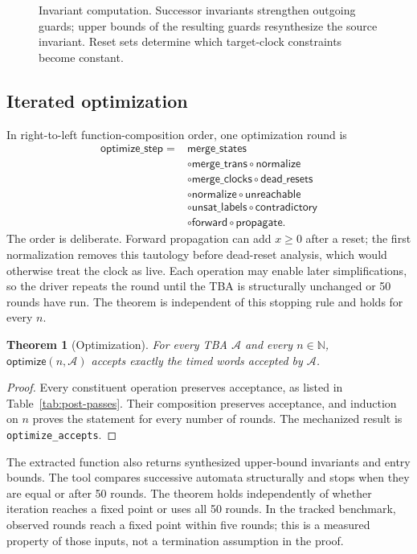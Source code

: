 \documentclass{ieeeaccess}
\providecommand{\Nat}{\mathbb{N}}
\providecommand{\optimize}{\mathsf{optimize}}
\newtheorem{theorem}{Theorem}[section]
\begin{document}
\begin{figure}[t]
\centering

\caption{Invariant computation. Successor invariants strengthen outgoing
guards; upper bounds of the resulting guards resynthesize the source
invariant. Reset sets determine which target-clock constraints become
constant.}
\label{fig:main-inv-unified}
\end{figure}



\subsection{Iterated optimization}
\label{sec:main-pipeline}
In right-to-left function-composition order, one optimization round is
\[
\begin{aligned}
\mathsf{optimize\_step}={}&\mathsf{merge\_states}\\
 &\circ\mathsf{merge\_trans}\circ\mathsf{normalize}\\
 &\circ\mathsf{merge\_clocks}\circ\mathsf{dead\_resets}\\
 &\circ\mathsf{normalize}\circ\mathsf{unreachable}\\
 &\circ\mathsf{unsat\_labels}\circ\mathsf{contradictory}\\
 &\circ\mathsf{forward}\circ\mathsf{propagate}.
\end{aligned}
\]
The order is deliberate. Forward propagation can add $x\ge0$ after a reset;
the first normalization removes this tautology before dead-reset analysis,
which would otherwise treat the clock as live. Each operation may enable
later simplifications, so the driver repeats the round until the TBA is
structurally unchanged or 50 rounds have run. The theorem is independent of
this stopping rule and holds for every $n$.

\begin{theorem}[Optimization]
\label{thm:optimization}
For every TBA $\mathcal A$ and every $n\in\Nat$, $\optimize(n,\mathcal A)$ accepts exactly the timed words accepted by $\mathcal A$.
\end{theorem}
\begin{proof}
Every constituent operation preserves acceptance, as listed in Table~\ref{tab:post-passes}. Their composition preserves acceptance, and induction on $n$ proves the statement for every number of rounds. The mechanized result is \texttt{optimize\_accepts}.
\end{proof}

The extracted function also returns synthesized upper-bound invariants and entry bounds. The tool compares successive automata structurally and stops when they are equal or after 50 rounds. The theorem holds independently of whether iteration reaches a fixed point or uses all 50 rounds. In the tracked benchmark, observed rounds reach a fixed point within five rounds; this is a measured property of those inputs, not a termination assumption in the proof.
\end{document}
